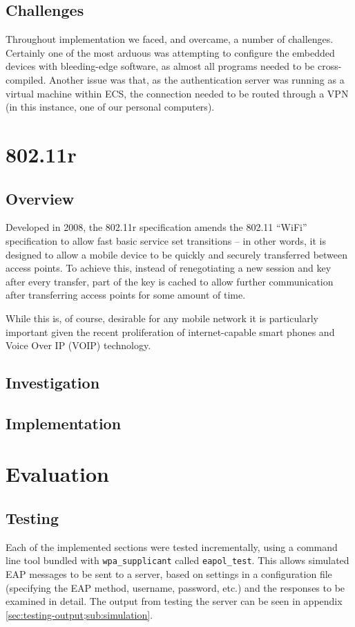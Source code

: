 \documentclass[12pt,a4paper,titlepage]{article}
\begin{document}
\subsection{Challenges}
Throughout implementation we faced, and overcame, a number of challenges. Certainly one of the most arduous was attempting to configure the embedded devices with bleeding-edge software, as almost all programs needed to be cross-compiled. Another issue was that, as the authentication server was running as a virtual machine within ECS, the connection needed to be routed through a VPN (in this instance, one of our personal computers).

\newpage
\section{802.11r}

\subsection{Overview}
Developed in 2008, the 802.11r specification amends the 802.11 ``WiFi'' specification to allow fast basic service set transitions -- in other words, it is designed to allow a mobile device to be quickly and securely transferred between access points. To achieve this, instead of renegotiating a new session and key after every transfer, part of the key is cached to allow further communication after transferring access points for some amount of time.

While this is, of course, desirable for any mobile network it is particularly important given the recent proliferation of internet-capable smart phones and Voice Over IP (VOIP) technology.

\subsection{Investigation}

\subsection{Implementation}

\newpage
\section{Evaluation}

\subsection{Testing}
Each of the implemented sections were tested incrementally, using a command line tool bundled with \texttt{wpa\_supplicant} called \texttt{eapol\_test}. This allows simulated EAP messages to be sent to a server, based on settings in a configuration file (specifying the EAP method, username, password, etc.) and the responses to be examined in detail. The output from testing the server can be seen in appendix \ref{sec:testing-output;sub:simulation}.
\end{document}
